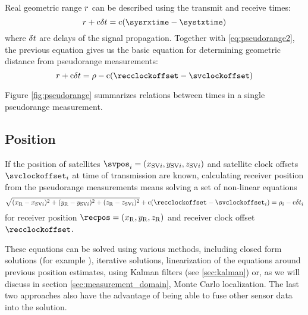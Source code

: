 Real geometric range \(r\) can be described using the transmit and receive times:
\begin{equation}
	\geomrange + \speedoflight\geomrangedelays = \speedoflight (\sysrxtime - \systxtime)
\end{equation}
where \(\delta{t}\) are delays of the signal propagation.
Together with \eqref{eq:pseudorange2}, the previous equation gives us
the basic equation for determining geometric distance from pseudorange measurements:
\begin{equation}
	\geomrange + \speedoflight\geomrangedelays = \rho - \speedoflight (\recclockoffset - \svclockoffset)
\end{equation}


Figure \ref{fig:pseudorange} summarizes relations between times in a single pseudorange measurement.

\subsection{Position}
\label{sec:gps-position}

If the position of satellites \(\svpos_i = \coord{x_{\mathrm{SV}i}}{y_{\mathrm{SV}i}}{z_{\mathrm{SV}i}}\) and satellite
clock offsets \(\svclockoffset_i\) at time of transmission are known,
calculating receiver position from the pseudorange measurements means solving a set of non-linear equations
\begin{equation}
	\sqrt{(x_\REC - x_{{\SV}i})^2 + (y_\REC - y_{{\SV}i})^2 +(z_\REC - z_{{\SV}i})^2} +
	\speedoflight (\recclockoffset - \svclockoffset_i)
	=
	\rho_i - \speedoflight\geomrangedelays_i
\end{equation}
for receiver position \(\recpos = \coord{x_\REC}{y_\REC}{z_\REC}\) and receiver clock offset \(\recclockoffset\).

These equations can be solved using various methods, including closed form solutions
(for example \cite{leva96}), iterative solutions, linearization of the equations around
previous position estimates, using Kalman filters (see \ref{sec:kalman}) or,
as we will discuss in section \ref{sec:measurement_domain}, Monte Carlo localization.
The last two approaches also have the advantage of being able to fuse other sensor data
into the solution.

